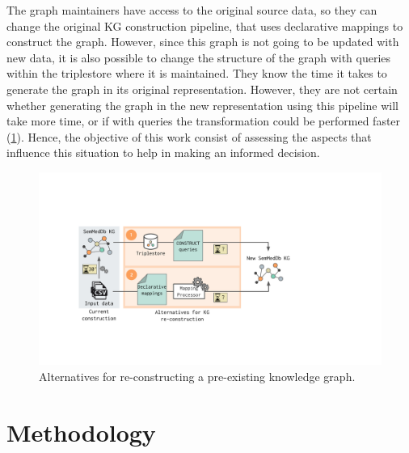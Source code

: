 The graph maintainers have access to the original source data, so they can change the original KG construction pipeline, that uses declarative mappings to construct the graph. However, since this graph is not going to be updated with new data, it is also possible to change the structure of the graph with queries within the triplestore where it is maintained. They know the time it takes to generate the graph in its original representation. However, they are not certain whether generating the graph in the new representation using this pipeline will take more time, or if with queries the transformation could be performed faster (\cref{fig:chp6-1_mot-example}). Hence, the objective of this work consist of assessing the aspects that influence this situation to help in making an informed decision.


\begin{figure}[t!]
    \centering
    \includegraphics[width=0.8\linewidth]{figures/chp6-1_motivating-example.pdf}
    \caption[KG re-construcion alternatives]{Alternatives for re-constructing a pre-existing knowledge graph.}
    \label{fig:chp6-1_mot-example}
\end{figure}

\section{Methodology}
\label{sec:chp6-1_methodology}

